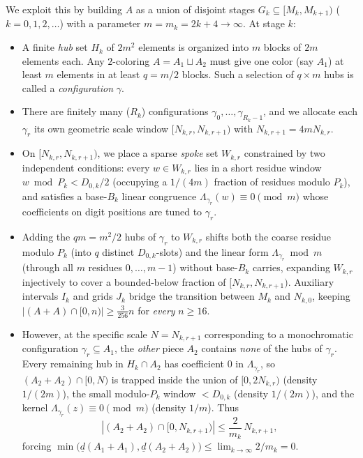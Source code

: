 \documentclass[11pt,a4paper]{amsart}
\theoremstyle{remark}
\newcommand{\ld}{\underline{d}}
\begin{document}
We exploit this by building $A$ as a union of disjoint stages $G_k \subseteq [M_k, M_{k+1})$ ($k = 0, 1, 2, \dots$) with a parameter $m = m_k = 2k + 4 \to \infty$. At stage $k$:
\begin{itemize}
\item A finite \emph{hub} set $H_k$ of $2 m^2$ elements is organized into $m$ blocks of $2 m$ elements each. Any $2$-coloring $A = A_1 \sqcup A_2$ must give one color (say $A_1$) at least $m$ elements in at least $q = m/2$ blocks. Such a selection of $q \times m$ hubs is called a \emph{configuration} $\gamma$.
\item There are finitely many ($R_k$) configurations $\gamma_0, \dots, \gamma_{R_k - 1}$, and we allocate each $\gamma_r$ its own geometric scale window $[N_{k,r}, N_{k,r+1})$ with $N_{k,r+1} = 4 m N_{k,r}$.
\item On $[N_{k,r}, N_{k,r+1})$, we place a sparse \emph{spoke} set $W_{k,r}$ constrained by two independent conditions: every $w \in W_{k,r}$ lies in a short residue window $w \bmod P_k < D_{0,k} / 2$ (occupying a $1/(4m)$ fraction of residues modulo $P_k$), and satisfies a base-$B_k$ linear congruence $\Lambda_{\gamma_r}(w) \equiv 0 \pmod{m}$ whose coefficients on digit positions are tuned to $\gamma_r$.
\item Adding the $q m = m^2 / 2$ hubs of $\gamma_r$ to $W_{k,r}$ shifts both the coarse residue modulo $P_k$ (into $q$ distinct $D_{0,k}$-slots) and the linear form $\Lambda_{\gamma_r} \bmod m$ (through all $m$ residues $0, \dots, m - 1$) without base-$B_k$ carries, expanding $W_{k,r}$ injectively to cover a bounded-below fraction of $[N_{k,r}, N_{k,r+1})$. Auxiliary intervals $I_k$ and grids $J_k$ bridge the transition between $M_k$ and $N_{k,0}$, keeping $|(A + A) \cap [0, n)| \ge \frac{3}{256} n$ for \emph{every} $n \ge 16$.
\item However, at the specific scale $N = N_{k,r+1}$ corresponding to a monochromatic configuration $\gamma_r \subseteq A_1$, the \emph{other} piece $A_2$ contains \emph{none} of the hubs of $\gamma_r$. Every remaining hub in $H_k \cap A_2$ has coefficient $0$ in $\Lambda_{\gamma_r}$, so $(A_2 + A_2) \cap [0, N)$ is trapped inside the union of $[0, 2 N_{k,r})$ (density $1/(2m)$), the small modulo-$P_k$ window $< D_{0,k}$ (density $1/(2m)$), and the kernel $\Lambda_{\gamma_r}(z) \equiv 0 \pmod{m}$ (density $1/m$). Thus
\[
|(A_2 + A_2) \cap [0, N_{k,r+1})| \le \frac{2}{m_k} \, N_{k,r+1},
\]
forcing $\min\bigl(\ld(A_1 + A_1), \ld(A_2 + A_2)\bigr) \le \lim_{k \to \infty} 2 / m_k = 0$.
\end{itemize}
\end{document}
